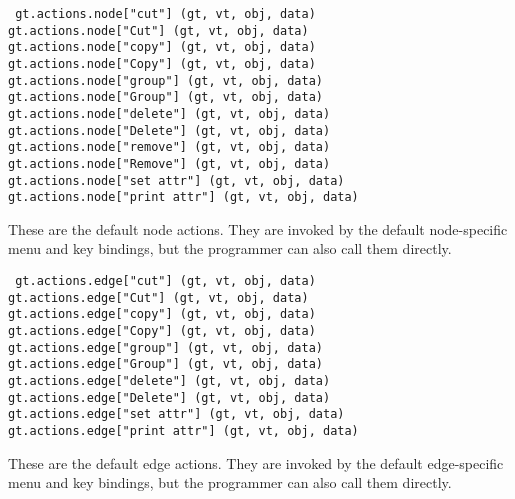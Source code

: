 \begin{flushleft}\tt
gt.actions.node["cut"] (gt, vt, obj, data)\\
gt.actions.node["Cut"] (gt, vt, obj, data)\\
gt.actions.node["copy"] (gt, vt, obj, data)\\
gt.actions.node["Copy"] (gt, vt, obj, data)\\
gt.actions.node["group"] (gt, vt, obj, data)\\
gt.actions.node["Group"] (gt, vt, obj, data)\\
gt.actions.node["delete"] (gt, vt, obj, data)\\
gt.actions.node["Delete"] (gt, vt, obj, data)\\
gt.actions.node["remove"] (gt, vt, obj, data)\\
gt.actions.node["Remove"] (gt, vt, obj, data)\\
gt.actions.node["set attr"] (gt, vt, obj, data)\\
gt.actions.node["print attr"] (gt, vt, obj, data)\\
\end{flushleft}\vspace{-2\itemsep}
These are the default node actions. They are invoked by the default
node-specific menu and key bindings, but the programmer can also call them
directly.

\begin{flushleft}\tt
gt.actions.edge["cut"] (gt, vt, obj, data)\\
gt.actions.edge["Cut"] (gt, vt, obj, data)\\
gt.actions.edge["copy"] (gt, vt, obj, data)\\
gt.actions.edge["Copy"] (gt, vt, obj, data)\\
gt.actions.edge["group"] (gt, vt, obj, data)\\
gt.actions.edge["Group"] (gt, vt, obj, data)\\
gt.actions.edge["delete"] (gt, vt, obj, data)\\
gt.actions.edge["Delete"] (gt, vt, obj, data)\\
gt.actions.edge["set attr"] (gt, vt, obj, data)\\
gt.actions.edge["print attr"] (gt, vt, obj, data)\\
\end{flushleft}\vspace{-2\itemsep}
These are the default edge actions. They are invoked by the default
edge-specific menu and key bindings, but the programmer can also call them
directly.

